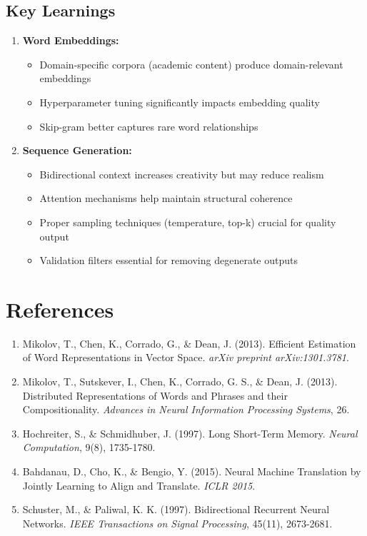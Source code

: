 \documentclass[12pt,a4paper]{article}
\begin{document}
\subsection{Key Learnings}

\begin{enumerate}
    \item \textbf{Word Embeddings:}
    \begin{itemize}
        \item Domain-specific corpora (academic content) produce domain-relevant embeddings
        \item Hyperparameter tuning significantly impacts embedding quality
        \item Skip-gram better captures rare word relationships
    \end{itemize}

    \item \textbf{Sequence Generation:}
    \begin{itemize}
        \item Bidirectional context increases creativity but may reduce realism
        \item Attention mechanisms help maintain structural coherence
        \item Proper sampling techniques (temperature, top-k) crucial for quality output
        \item Validation filters essential for removing degenerate outputs
    \end{itemize}
\end{enumerate}

\section{References}

\begin{enumerate}
    \item Mikolov, T., Chen, K., Corrado, G., \& Dean, J. (2013). Efficient Estimation of Word Representations in Vector Space. \textit{arXiv preprint arXiv:1301.3781}.

    \item Mikolov, T., Sutskever, I., Chen, K., Corrado, G. S., \& Dean, J. (2013). Distributed Representations of Words and Phrases and their Compositionality. \textit{Advances in Neural Information Processing Systems}, 26.

    \item Hochreiter, S., \& Schmidhuber, J. (1997). Long Short-Term Memory. \textit{Neural Computation}, 9(8), 1735-1780.

    \item Bahdanau, D., Cho, K., \& Bengio, Y. (2015). Neural Machine Translation by Jointly Learning to Align and Translate. \textit{ICLR 2015}.

    \item Schuster, M., \& Paliwal, K. K. (1997). Bidirectional Recurrent Neural Networks. \textit{IEEE Transactions on Signal Processing}, 45(11), 2673-2681.
\end{enumerate}
\end{document}
